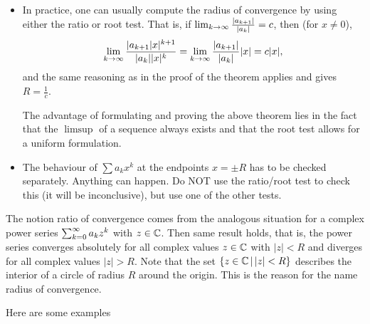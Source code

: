 \documentclass[10pt, a4paper]{article}
\begin{document}
\begin{remark}\phantom{}
    \begin{itemize}
        \item In practice,
        one can usually compute the radius of convergence by using either the ratio or root test.
        That is,
        if $\liminfty[k]\frac{|a_{k + 1}|}{|a_k|} = c$,
        then (for $x \neq 0$),
        \[
        \liminfty[k]\frac{|a_{k + 1}|x| ^ {k + 1}}{|a_k||x| ^ k} = \liminfty[k]\frac{|a_{k + 1}|}{|a_k|}|x| = c|x|,
        \]
        and the same reasoning as in the proof of the theorem applies and gives $R = \frac{1}{c}$.

        The advantage of formulating and proving the above theorem lies in the fact that the $\limsup$ of a sequence always exists and that the root test allows for a uniform formulation.

        \item The behaviour of $\sum a_kx ^ k$ at the endpoints $x = \pm R$ has to be checked separately.
        Anything can happen.
        Do NOT use the ratio/root test to check this
        (it will be inconclusive),
        but use one of the other tests.
    \end{itemize}
\end{remark}

\begin{remark}
    The notion ratio of convergence comes from the analogous situation for a complex power series $\infsumo a_kz ^ k$ with $z \in \C$.
    Then same result holds,
    that is,
    the power series converges absolutely for all complex values $z \in \C$ with $|z| < R$ and diverges for all complex values $|z| > R$.
    Note that the set $\{z \in \C\,|\, |z| < R\}$ describes the interior of a circle of radius $R$ around the origin.
    This is the reason for the name radius of convergence.
\end{remark}

Here are some examples
\end{document}
